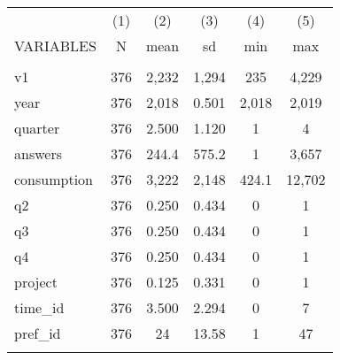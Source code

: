 \documentclass[]{article}
\begin{document}
\begin{tabular}{lccccc} \hline
 & (1) & (2) & (3) & (4) & (5) \\
VARIABLES & N & mean & sd & min & max \\ \hline
 &  &  &  &  &  \\
v1 & 376 & 2,232 & 1,294 & 235 & 4,229 \\
year & 376 & 2,018 & 0.501 & 2,018 & 2,019 \\
quarter & 376 & 2.500 & 1.120 & 1 & 4 \\
answers & 376 & 244.4 & 575.2 & 1 & 3,657 \\
consumption & 376 & 3,222 & 2,148 & 424.1 & 12,702 \\
q2 & 376 & 0.250 & 0.434 & 0 & 1 \\
q3 & 376 & 0.250 & 0.434 & 0 & 1 \\
q4 & 376 & 0.250 & 0.434 & 0 & 1 \\
project & 376 & 0.125 & 0.331 & 0 & 1 \\
time\_id & 376 & 3.500 & 2.294 & 0 & 7 \\
pref\_id & 376 & 24 & 13.58 & 1 & 47 \\
 &  &  &  &  &  \\ \hline
\end{tabular}
\end{document}
